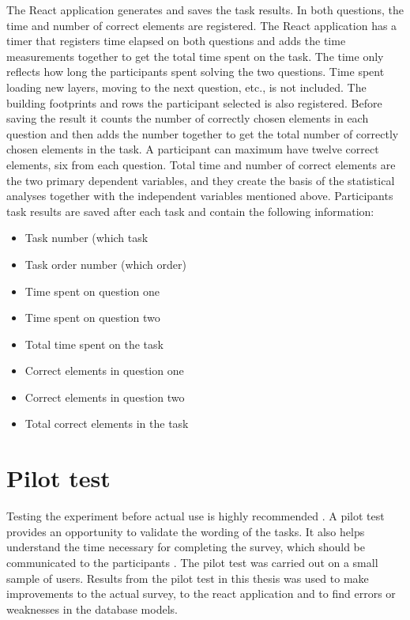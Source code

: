 The React application generates and saves the task results. In both questions, the time and number of correct elements are registered. The React application has a timer that registers time elapsed on both questions and adds the time measurements together to get the total time spent on the task. The time only reflects how long the participants spent solving the two questions. Time spent loading new layers, moving to the next question, etc., is not included. The building footprints and rows the participant selected is also registered. Before saving the result it counts the number of correctly chosen elements in each question and then adds the number together to get the total number of correctly chosen elements in the task. A participant can maximum have twelve correct elements, six from each question. Total time and number of correct elements are the two primary dependent variables, and they create the basis of the statistical analyses together with the independent variables mentioned above. Participants task results are saved after each task and contain the following information:

\begin{itemize}
	\item Task number (which task
	\item Task order number (which order)
	\item Time spent on question one 
	\item Time spent on question two
	\item Total time spent on the task
	\item Correct elements in question one
	\item Correct elements in question two
	\item Total correct elements in the task
\end{itemize}
\vspace{0.2cm}

\section{Pilot test}
Testing the experiment before actual use is highly recommended \citep{Ben2009}. A pilot test provides an opportunity to validate the wording of the tasks. It also helps understand the time necessary for completing the survey, which should be communicated to the participants \citep{Schade2015}. The pilot test was carried out on a small sample of users. Results from the pilot test in this thesis was used to make improvements to the actual survey, to the react application and to find errors or weaknesses in the database models.

